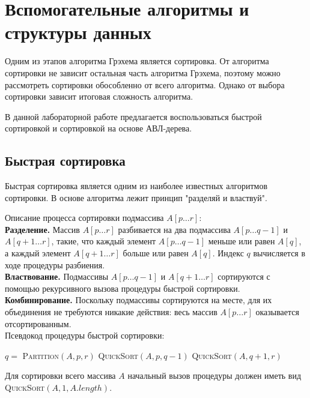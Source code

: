 \section{Вспомогательные алгоритмы и структуры данных}
Одним из этапов алгоритма Грэхема является сортировка. От алгоритма сортировки не зависит остальная часть алгоритма Грэхема, поэтому можно рассмотреть сортировки обособленно от всего алгоритма. Однако от выбора сортировки зависит итоговая сложность алгоритма.

В данной лабораторной работе предлагается воспользоваться быстрой сортировкой и сортировкой на основе АВЛ-дерева.

\subsection{Быстрая сортировка}

Быстрая сортировка\footnotemark{} является одним из наиболее известных алгоритмов сортировки. В основе алгоритма лежит принцип "разделяй и властвуй".


Описание процесса сортировки подмассива $A[p \dots r]$:\\
\textbf{Разделение.} Массив $A[p \dots r]$ разбивается на два подмассива $A[p \dots q-1]$ и $A[q+1 \dots r]$, такие, что каждый элемент $A[p \dots q-1]$ меньше или равен $A[q]$, а каждый элемент $A[q+1 \dots r]$ больше или равен $A[q]$. Индекс $q$ вычисляется в ходе процедуры разбиения.\\
\textbf{Властвование.} Подмассивы $A[p \dots q-1]$ и $A[q+1 \dots r]$ сортируются с помощью рекурсивного вызова процедуры быстрой сортировки.\\
\textbf{Комбинирование.} Поскольку подмассивы сортируются на месте, для их объединения не требуются никакие действия: весь массив $A[p \dots r]$ оказывается отсортированным.\\

\noindent Псевдокод процедуры быстрой сортировки:
\begin{algorithmic}[1]
			\State $q =$ \textsc{Partition}$(A,p,r)$
			\State \textsc{QuickSort}$(A,p,q-1)$
			\State \textsc{QuickSort}$(A,q+1,r)$
		\EndIf
	\EndProcedure
\end{algorithmic}

Для сортировки всего массива $A$ начальный вызов процедуры должен иметь вид
\textsc{QuickSort}$(A,1,A.length)$.

